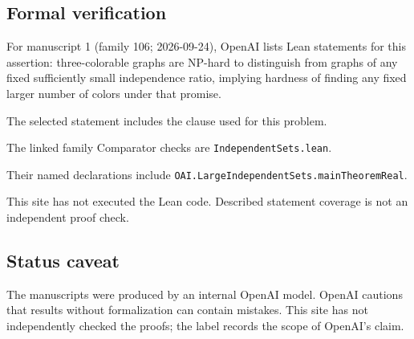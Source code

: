\documentclass[11pt]{article}
\begin{document}
\subsection{Formal verification}
For manuscript 1 (family 106; 2026-09-24), OpenAI lists Lean statements for this assertion: three-colorable graphs are NP-hard to distinguish from graphs of any fixed sufficiently small independence ratio, implying hardness of finding any fixed larger number of colors under that promise.

The selected statement includes the clause used for this problem.

The linked family Comparator checks are \texttt{IndependentSets.lean}.

Their named declarations include \texttt{OAI.LargeIndependentSets.mainTheoremReal}.

This site has not executed the Lean code. Described statement coverage is not an independent proof check.

\subsection{Status caveat}
The manuscripts were produced by an internal OpenAI model. OpenAI cautions that results without formalization can contain mistakes. This site has not independently checked the proofs; the label records the scope of OpenAI's claim.
\end{document}
